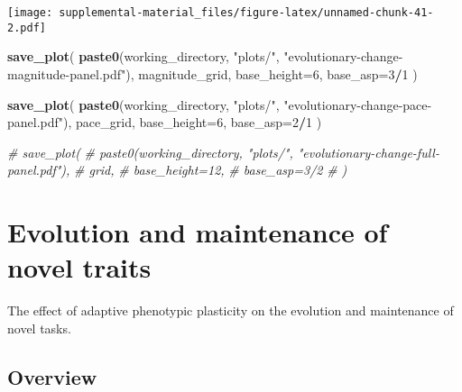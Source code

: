\documentclass[]{book}
\newenvironment{Shaded}{\begin{snugshade}}{\end{snugshade}}
\newcommand{\CommentTok}[1]{\textcolor[rgb]{0.56,0.35,0.01}{\textit{#1}}}
\newcommand{\DataTypeTok}[1]{\textcolor[rgb]{0.13,0.29,0.53}{#1}}
\newcommand{\DecValTok}[1]{\textcolor[rgb]{0.00,0.00,0.81}{#1}}
\newcommand{\KeywordTok}[1]{\textcolor[rgb]{0.13,0.29,0.53}{\textbf{#1}}}
\newcommand{\NormalTok}[1]{#1}
\newcommand{\OperatorTok}[1]{\textcolor[rgb]{0.81,0.36,0.00}{\textbf{#1}}}
\newcommand{\StringTok}[1]{\textcolor[rgb]{0.31,0.60,0.02}{#1}}
\begin{document}
\texttt{[image: supplemental-material\_files/figure-latex/unnamed-chunk-41-2.pdf]}

\begin{Shaded}
\begin{Highlighting}[]
\KeywordTok{save_plot}\NormalTok{(}
  \KeywordTok{paste0}\NormalTok{(working_directory, }\StringTok{"plots/"}\NormalTok{, }\StringTok{"evolutionary-change-magnitude-panel.pdf"}\NormalTok{),}
\NormalTok{  magnitude_grid,}
  \DataTypeTok{base_height=}\DecValTok{6}\NormalTok{,}
  \DataTypeTok{base_asp=}\DecValTok{3}\OperatorTok{/}\DecValTok{1}
\NormalTok{)}

\KeywordTok{save_plot}\NormalTok{(}
  \KeywordTok{paste0}\NormalTok{(working_directory, }\StringTok{"plots/"}\NormalTok{, }\StringTok{"evolutionary-change-pace-panel.pdf"}\NormalTok{),}
\NormalTok{  pace_grid,}
  \DataTypeTok{base_height=}\DecValTok{6}\NormalTok{,}
  \DataTypeTok{base_asp=}\DecValTok{2}\OperatorTok{/}\DecValTok{1}
\NormalTok{)}

\CommentTok{# save_plot(}
\CommentTok{#   paste0(working_directory, "plots/", "evolutionary-change-full-panel.pdf"),}
\CommentTok{#   grid,}
\CommentTok{#   base_height=12,}
\CommentTok{#   base_asp=3/2}
\CommentTok{# )}
\end{Highlighting}
\end{Shaded}

\hypertarget{evolution-and-maintenance-of-novel-traits}{%
\chapter{Evolution and maintenance of novel traits}\label{evolution-and-maintenance-of-novel-traits}}

The effect of adaptive phenotypic plasticity on the evolution and maintenance of novel tasks.

\hypertarget{overview-2}{%
\section{Overview}\label{overview-2}}
\end{document}
